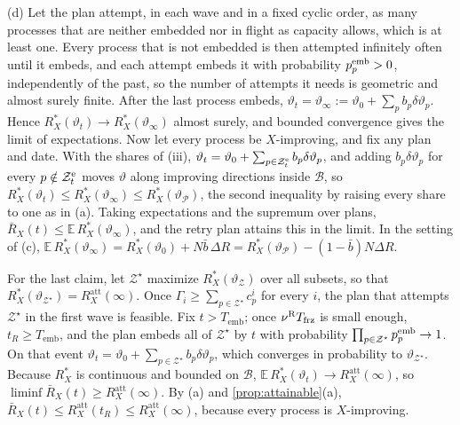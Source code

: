 (d) Let the plan attempt, in each wave and in a fixed cyclic order, as many processes that are neither embedded nor in flight as capacity allows, which is at least one. Every process that is not embedded is then attempted infinitely often until it embeds, and each attempt embeds it with probability $p^{\rm emb}_p>0$, independently of the past, so the number of attempts it needs is geometric and almost surely finite. After the last process embeds, $\vartheta_t=\vartheta_\infty:=\vartheta_0+\sum_pb_p\delta\vartheta_p$. Hence $R^*_X(\vartheta_t)\to R^*_X(\vartheta_\infty)$ almost surely, and bounded convergence gives the limit of expectations. Now let every process be $X$-improving, and fix any plan and date. With the shares of (iii), $\vartheta_t=\vartheta_0+\sum_{p\in\mathcal Z^{\rm e}_t}b_p\delta\vartheta_p$, and adding $b_p\delta\vartheta_p$ for every $p\notin\mathcal Z^{\rm e}_t$ moves $\vartheta$ along improving directions inside $\mathcal B$, so $R^*_X(\vartheta_t)\le R^*_X(\vartheta_\infty)\le R^*_X(\vartheta_{\mathcal P})$, the second inequality by raising every share to one as in (a). Taking expectations and the supremum over plans, $\bar R_X(t)\le\mathbb E\,R^*_X(\vartheta_\infty)$, and the retry plan attains this in the limit. In the setting of (c), $\mathbb E\,R^*_X(\vartheta_\infty)=R^*_X(\vartheta_0)+N\bar b\,\Delta R=R^*_X(\vartheta_{\mathcal P})-(1-\bar b)N\Delta R$.

For the last claim, let $\mathcal Z^\star$ maximize $R^*_X(\vartheta_{\mathcal Z})$ over all subsets, so that $R^*_X(\vartheta_{\mathcal Z^\star})=R^{\mathrm{att}}_X(\infty)$. Once $\Gamma_i\ge\sum_{p\in\mathcal Z^\star}c^i_p$ for every $i$, the plan that attempts $\mathcal Z^\star$ in the first wave is feasible. Fix $t>T_{\mathrm{emb}}$; once $\nu^{\rm R}T_{\rm frz}$ is small enough, $t_R\ge T_{\mathrm{emb}}$, and the plan embeds all of $\mathcal Z^\star$ by $t$ with probability $\prod_{p\in\mathcal Z^\star}p^{\rm emb}_p\to1$. On that event $\vartheta_t=\vartheta_0+\sum_{p\in\mathcal Z^\star}b_p\delta\vartheta_p$, which converges in probability to $\vartheta_{\mathcal Z^\star}$. Because $R^*_X$ is continuous and bounded on $\mathcal B$, $\mathbb E\,R^*_X(\vartheta_t)\to R^{\mathrm{att}}_X(\infty)$, so $\liminf\bar R_X(t)\ge R^{\mathrm{att}}_X(\infty)$. By (a) and \autoref{prop:attainable}(a), $\bar R_X(t)\le R^{\mathrm{att}}_X(t_R)\le R^{\mathrm{att}}_X(\infty)$, because every process is $X$-improving.

